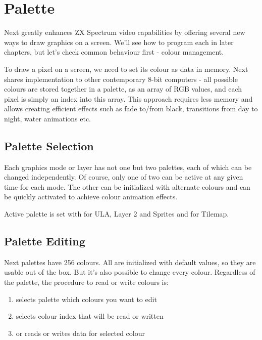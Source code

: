 \section{Palette}
\label{zx_next_palette}

Next greatly enhances ZX Spectrum video capabilities by offering several new ways to draw graphics on a screen. We'll see how to program each in later chapters, but let's check common behaviour first - colour management.

To draw a pixel on a screen, we need to set its colour as data in memory. Next shares implementation to other contemporary 8-bit computers - all possible colours are stored together in a palette, as an array of RGB values, and each pixel is simply an index into this array. This approach requires less memory and allows creating efficient effects such as fade to/from black, transitions from day to night, water animations etc.


\subsection{Palette Selection}

Each graphics mode or layer has not one but two palettes, each of which can be changed independently. Of course, only one of two can be active at any given time for each mode. The other can be initialized with alternate colours and can be quickly activated to achieve colour animation effects.

Active palette is set with  for ULA, Layer 2 and Sprites and  for Tilemap.


\subsection{Palette Editing}

Next palettes have 256 colours. All are initialized with default values, so they are usable out of the box. But it's also possible to change every colour. Regardless of the palette, the procedure to read or write colours is:

\begin{enumerate}[topsep=1pt,itemsep=1pt]
	\item {} selects palette which colours you want to edit
	\item {} selects colour index that will be read or written
	\item {} or  reads or writes data for selected colour
\end{enumerate}


